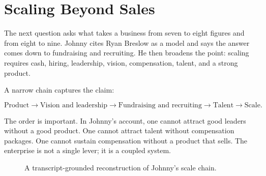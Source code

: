 \section{Scaling Beyond Sales}

The next question asks what takes a business from seven to eight figures and from eight to nine. Johnny cites Ryan Breslow as a model and says the answer comes down to fundraising and recruiting. He then broadens the point: scaling requires cash, hiring, leadership, vision, compensation, talent, and a strong product.

A narrow chain captures the claim:

\begin{equation}
\text{Product}
\longrightarrow
\text{Vision and leadership}
\longrightarrow
\text{Fundraising and recruiting}
\longrightarrow
\text{Talent}
\longrightarrow
\text{Scale}.
\end{equation}

The order is important. In Johnny's account, one cannot attract good leaders without a good product. One cannot attract talent without compensation packages. One cannot sustain compensation without a product that sells. The enterprise is not a single lever; it is a coupled system.

\begin{figure}
\centering
{}
\caption{A transcript-grounded reconstruction of Johnny's scale chain.}
\end{figure}

